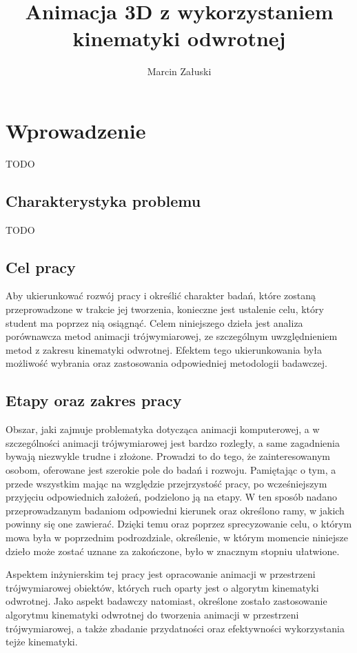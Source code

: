 \documentclass[11pt]{mwrep}
\author{Marcin Załuski}
\title{Animacja 3D z wykorzystaniem kinematyki odwrotnej}
\begin{document}
\maketitle
{}
\tableofcontents
\linenumbers
\chapter{Wprowadzenie}
TODO

  \section{Charakterystyka problemu}
TODO

  \section{Cel pracy}
  Aby ukierunkować rozwój pracy i określić charakter badań, które zostaną przeprowadzone w trakcie jej tworzenia, konieczne jest ustalenie celu, który student ma poprzez nią osiągnąć. Celem niniejszego dzieła jest analiza porównawcza metod animacji trójwymiarowej, ze szczególnym uwzględnieniem metod z zakresu kinematyki odwrotnej. Efektem tego ukierunkowania była możliwość wybrania oraz zastosowania odpowiedniej metodologii badawczej.

  \section{Etapy oraz zakres pracy}

  Obszar, jaki zajmuje problematyka dotycząca animacji komputerowej, a w szczególności animacji trójwymiarowej jest bardzo rozległy, a same zagadnienia bywają niezwykle trudne i złożone. Prowadzi to do tego, że zainteresowanym osobom, oferowane jest szerokie pole do badań i rozwoju. Pamiętając o tym, a przede wszystkim mając na względzie przejrzystość pracy, po wcześniejszym przyjęciu odpowiednich założeń, podzielono ją na etapy. W ten sposób nadano przeprowadzanym badaniom odpowiedni kierunek oraz określono ramy, w jakich powinny się one zawierać. Dzięki temu oraz poprzez sprecyzowanie celu, o którym mowa była w poprzednim podrozdziale, określenie, w którym momencie niniejsze dzieło może zostać uznane za zakończone, było w znacznym stopniu ułatwione.

  Aspektem inżynierskim tej pracy jest opracowanie animacji w przestrzeni trójwymiarowej obiektów, których ruch oparty jest o algorytm kinematyki odwrotnej. Jako aspekt badawczy natomiast, określone zostało zastosowanie algorytmu kinematyki odwrotnej do tworzenia animacji w przestrzeni trójwymiarowej, a także zbadanie przydatności oraz efektywności wykorzystania tejże kinematyki.
\end{document}
